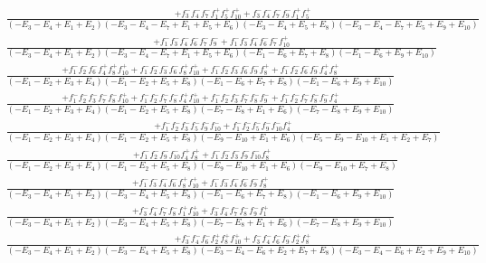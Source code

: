 \documentclass{article}
\begin{document}
\[\begin{array}{rcl}
\frac{+f_{3}^{-}f_{4}^{-}f_{7}^{-}f_{1}^{+}f_{5}^{+}f_{10}^{+}+f_{3}^{-}f_{4}^{-}f_{7}^{-}f_{9}^{-}f_{1}^{+}f_{5}^{+}}{(-E_{3}-E_{4}+E_{1}+E_{2})(-E_{3}-E_{4}-E_{7}+E_{1}+E_{5}+E_{6})(-E_{3}-E_{4}+E_{5}+E_{8})(-E_{3}-E_{4}-E_{7}+E_{5}+E_{9}+E_{10})}\\
\frac{+f_{1}^{-}f_{3}^{-}f_{4}^{-}f_{6}^{-}f_{7}^{-}f_{9}^{-}+f_{1}^{-}f_{3}^{-}f_{4}^{-}f_{6}^{-}f_{7}^{-}f_{10}^{+}}{(-E_{3}-E_{4}+E_{1}+E_{2})(-E_{3}-E_{4}-E_{7}+E_{1}+E_{5}+E_{6})(-E_{1}-E_{6}+E_{7}+E_{8})(-E_{1}-E_{6}+E_{9}+E_{10})}\\
\frac{+f_{1}^{-}f_{2}^{-}f_{6}^{-}f_{4}^{+}f_{8}^{+}f_{10}^{+}+f_{1}^{-}f_{2}^{-}f_{3}^{-}f_{6}^{-}f_{8}^{+}f_{10}^{+}+f_{1}^{-}f_{2}^{-}f_{3}^{-}f_{6}^{-}f_{9}^{-}f_{8}^{+}+f_{1}^{-}f_{2}^{-}f_{6}^{-}f_{9}^{-}f_{4}^{+}f_{8}^{+}}{(-E_{1}-E_{2}+E_{3}+E_{4})(-E_{1}-E_{2}+E_{5}+E_{8})(-E_{1}-E_{6}+E_{7}+E_{8})(-E_{1}-E_{6}+E_{9}+E_{10})}\\
\frac{+f_{1}^{-}f_{2}^{-}f_{3}^{-}f_{7}^{-}f_{8}^{-}f_{10}^{+}+f_{1}^{-}f_{2}^{-}f_{7}^{-}f_{8}^{-}f_{4}^{+}f_{10}^{+}+f_{1}^{-}f_{2}^{-}f_{3}^{-}f_{7}^{-}f_{8}^{-}f_{9}^{-}+f_{1}^{-}f_{2}^{-}f_{7}^{-}f_{8}^{-}f_{9}^{-}f_{4}^{+}}{(-E_{1}-E_{2}+E_{3}+E_{4})(-E_{1}-E_{2}+E_{5}+E_{8})(-E_{7}-E_{8}+E_{1}+E_{6})(-E_{7}-E_{8}+E_{9}+E_{10})}\\
\frac{+f_{1}^{-}f_{2}^{-}f_{3}^{-}f_{5}^{-}f_{9}^{-}f_{10}^{-}+f_{1}^{-}f_{2}^{-}f_{5}^{-}f_{9}^{-}f_{10}^{-}f_{4}^{+}}{(-E_{1}-E_{2}+E_{3}+E_{4})(-E_{1}-E_{2}+E_{5}+E_{8})(-E_{9}-E_{10}+E_{1}+E_{6})(-E_{5}-E_{9}-E_{10}+E_{1}+E_{2}+E_{7})}\\
\frac{+f_{1}^{-}f_{2}^{-}f_{9}^{-}f_{10}^{-}f_{4}^{+}f_{8}^{+}+f_{1}^{-}f_{2}^{-}f_{3}^{-}f_{9}^{-}f_{10}^{-}f_{8}^{+}}{(-E_{1}-E_{2}+E_{3}+E_{4})(-E_{1}-E_{2}+E_{5}+E_{8})(-E_{9}-E_{10}+E_{1}+E_{6})(-E_{9}-E_{10}+E_{7}+E_{8})}\\
\frac{+f_{1}^{-}f_{3}^{-}f_{4}^{-}f_{6}^{-}f_{8}^{+}f_{10}^{+}+f_{1}^{-}f_{3}^{-}f_{4}^{-}f_{6}^{-}f_{9}^{-}f_{8}^{+}}{(-E_{3}-E_{4}+E_{1}+E_{2})(-E_{3}-E_{4}+E_{5}+E_{8})(-E_{1}-E_{6}+E_{7}+E_{8})(-E_{1}-E_{6}+E_{9}+E_{10})}\\
\frac{+f_{3}^{-}f_{4}^{-}f_{7}^{-}f_{8}^{-}f_{1}^{+}f_{10}^{+}+f_{3}^{-}f_{4}^{-}f_{7}^{-}f_{8}^{-}f_{9}^{-}f_{1}^{+}}{(-E_{3}-E_{4}+E_{1}+E_{2})(-E_{3}-E_{4}+E_{5}+E_{8})(-E_{7}-E_{8}+E_{1}+E_{6})(-E_{7}-E_{8}+E_{9}+E_{10})}\\
\frac{+f_{3}^{-}f_{4}^{-}f_{6}^{-}f_{2}^{+}f_{8}^{+}f_{10}^{+}+f_{3}^{-}f_{4}^{-}f_{6}^{-}f_{9}^{-}f_{2}^{+}f_{8}^{+}}{(-E_{3}-E_{4}+E_{1}+E_{2})(-E_{3}-E_{4}+E_{5}+E_{8})(-E_{3}-E_{4}-E_{6}+E_{2}+E_{7}+E_{8})(-E_{3}-E_{4}-E_{6}+E_{2}+E_{9}+E_{10})}\\

\end{array}\]
\end{document}
